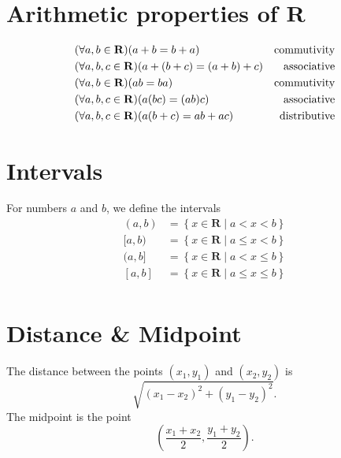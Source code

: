 \documentclass[letterpaper,landscape,9pt,fleqn]{extarticle}
\newcommand{\reals}{\mathbf{R}}
\newcommand{\ssep}{\mid}
\DeclarePairedDelimiter{\parens}{\lparen}{\rparen}
\begin{document}
\begin{multicols*}{3}
\section*{Arithmetic properties of \(\reals\)}
\begin{alignat*}{2}
    &\parens*{\forall a,b\in \reals} \parens*{a + b = b + a} & \mbox{commutivity}\\
    &\parens*{\forall a,b,c\in \reals} \parens*{a + (b + c)  = (a+b)+c} & \mbox{associative}\\
    &\parens*{\forall a,b \in \reals} \parens*{a  b = b a} & \mbox{commutivity}\\
    &\parens*{\forall a,b,c \in \reals} \parens*{a  (b c) = (a b) c} & \mbox{associative}\\
    &\parens*{\forall a,b,c \in \reals} \parens*{a (b+c) =a b + a c} & \mbox{distributive}\\
\end{alignat*}

\section*{Intervals}
\begin{minipage}[c]{0.3333333333333\textwidth}
For numbers \(a\) and \(b\), we define the intervals
\begin{align*}
 (a,b) &= \left\{x \in \reals \ssep a < x < b \right\}  \\
  [a,b) &= \left \{x  \in \reals  \ssep a \leq  x < b \right \} \\
   (a,b] &= \left \{x  \in \reals \ssep a <  x \leq  b \right \} \\
    [a,b]  &= \left \{x  \in \reals \ssep a \leq  x \leq  b \right \} \\
\end{align*}  
\end{minipage}
\vspace{-0.25in}

\section*{Distance \& Midpoint}
\vspace{-0.15in}
\begin{minipage}[c]{0.3333333333333\textwidth}
The distance between the points \((x_1,y_1)\) and  \((x_2,y_2)\) is
\[
  \sqrt{(x_1-x_2)^2 + (y_1-y_2)^2}.
\]
The midpoint is the point
\[
\left(\frac{x_1+x_2}{2}, \frac{y_1+y_2}{2} \right).
\]
\end{minipage}


\end{multicols*}
\end{document}
